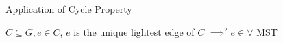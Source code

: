 \begin{frame}{}
  \begin{exampleblock}{Application of Cycle Property }
    \centerline{$C \subseteq G, e \in C$, $e$ is the unique lightest edge of $C$ $\implies^{?} e \in \forall$ MST}
  \end{exampleblock}

  \pause
  \vspace{0.50cm}
\end{frame}
